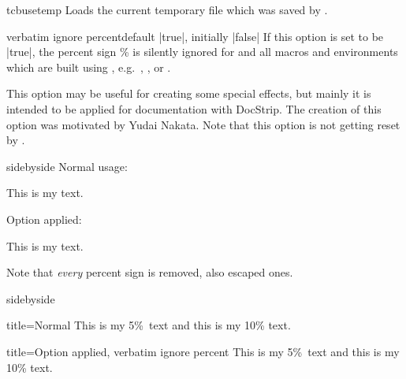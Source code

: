 \begin{docCommand}{tcbusetemp}{}
  Loads the current temporary file which was saved by .
\end{docCommand}

\clearpage

\begin{docTcbKey}[][doc new=2017-07-05]{verbatim ignore percent}{}{default |true|, initially |false|}
  If this option is set to be |true|, the percent sign \% is silently
  ignored for  and all macros and environments
  which are built using , e.g.\ 
  , , or .\par
  This option may be useful for creating some special effects, but mainly
  it is intended to be applied for documentation with DocStrip.
  The creation of this option was motivated by Yudai Nakata.
  Note that this option is not getting reset by .
\begin{dispExample*}{sidebyside}
Normal usage:
\begin{tcbwritetemp}
This is my text.
\end{tcbwritetemp}

\tcbusetemp

\bigskip Option applied:
\begin{tcbwritetemp}
This is my text.
\end{tcbwritetemp}

\tcbusetemp
\end{dispExample*}

\begin{marker}
Note that \emph{every} percent sign is removed, also escaped ones.
\end{marker}

\begin{dispExample*}{sidebyside}
\def\percent{\%}

\begin{tcblisting}{title=Normal}
This is my 5\percent\ text
and this is my 10\% text.
\end{tcblisting}

\begin{tcblisting}{
  title=Option applied,
  verbatim ignore percent}
This is my 5\percent\ text
and this is my 10\% text.
\end{tcblisting}
\end{dispExample*}

\end{docTcbKey}

